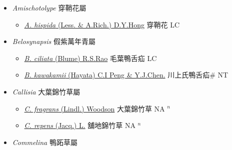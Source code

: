 
  \begin{itemize}
 \item[] \textit{Amischotolype} 穿鞘花屬
                    
  \begin{itemize}
        \item[] \href{http://www.theplantlist.org/tpl1.1/search?q=Amischotolype+hispida}{\textit{A. hispida} (Less. \& A.Rich.) D.Y.Hong}   穿鞘花 LC
  \end{itemize}
 \item[] \textit{Belosynapsis} 假紫萬年青屬
                    
  \begin{itemize}
        \item[] \href{http://www.theplantlist.org/tpl1.1/search?q=Belosynapsis+ciliata}{\textit{B. ciliata} (Blume) R.S.Rao}   毛葉鴨舌疝 LC
        \item[] \href{http://www.theplantlist.org/tpl1.1/search?q=Belosynapsis+kawakamii}{\textit{B. kawakamii} (Hayata) C.I Peng \& Y.J.Chen.}   川上氏鴨舌疝\# NT
  \end{itemize}
 \item[] \textit{Callisia} 大葉錦竹草屬
                    
  \begin{itemize}
        \item[] \href{http://www.theplantlist.org/tpl1.1/search?q=Callisia+fragrans}{\textit{C. fragrans} (Lindl.) Woodson}   大葉錦竹草 NA $^n$
        \item[] \href{http://www.theplantlist.org/tpl1.1/search?q=Callisia+repens}{\textit{C. repens} (Jacq.) L.}   舖地錦竹草 NA $^n$
  \end{itemize}
 \item[] \textit{Commelina} 鴨跖草屬
                    

\end{itemize}
